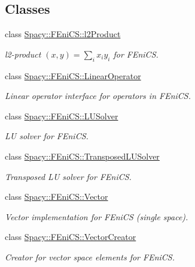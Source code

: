 \subsection*{Classes}
\begin{DoxyCompactItemize}
\item 
class \hyperlink{classSpacy_1_1FEniCS_1_1l2Product}{Spacy\+::\+F\+Eni\+C\+S\+::l2\+Product}
\begin{DoxyCompactList}\small\item\em l2-\/product $(x,y) = \sum_i x_i y_i $ for F\+Eni\+CS. \end{DoxyCompactList}\item 
class \hyperlink{classSpacy_1_1FEniCS_1_1LinearOperator}{Spacy\+::\+F\+Eni\+C\+S\+::\+Linear\+Operator}
\begin{DoxyCompactList}\small\item\em Linear operator interface for operators in F\+Eni\+CS. \end{DoxyCompactList}\item 
class \hyperlink{classSpacy_1_1FEniCS_1_1LUSolver}{Spacy\+::\+F\+Eni\+C\+S\+::\+L\+U\+Solver}
\begin{DoxyCompactList}\small\item\em LU solver for F\+Eni\+CS. \end{DoxyCompactList}\item 
class \hyperlink{classSpacy_1_1FEniCS_1_1TransposedLUSolver}{Spacy\+::\+F\+Eni\+C\+S\+::\+Transposed\+L\+U\+Solver}
\begin{DoxyCompactList}\small\item\em Transposed LU solver for F\+Eni\+CS. \end{DoxyCompactList}\item 
class \hyperlink{classSpacy_1_1FEniCS_1_1Vector}{Spacy\+::\+F\+Eni\+C\+S\+::\+Vector}
\begin{DoxyCompactList}\small\item\em Vector implementation for F\+Eni\+CS (single space). \end{DoxyCompactList}\item 
class \hyperlink{classSpacy_1_1FEniCS_1_1VectorCreator}{Spacy\+::\+F\+Eni\+C\+S\+::\+Vector\+Creator}
\begin{DoxyCompactList}\small\item\em Creator for vector space elements for F\+Eni\+CS. \end{DoxyCompactList}\end{DoxyCompactItemize}
